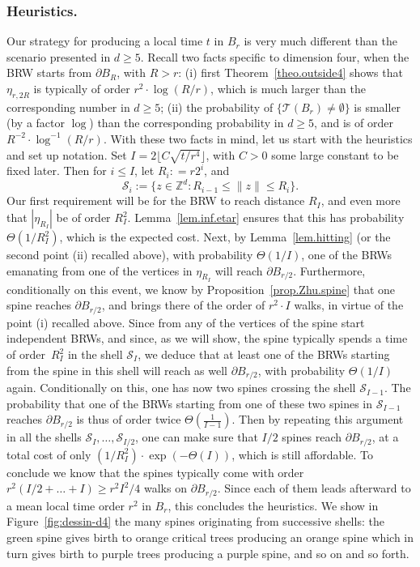 \subsubsection*{Heuristics.}
Our strategy for producing a local time $t$ in $B_r$
is very much different than the scenario presented in $d\ge 5$.
Recall
two facts specific to dimension four, when the BRW starts from $\partial B_R$, with $R>r$: (i) first Theorem~\ref{theo.outside4} shows that $\eta_{r,2R}$
is typically of order
$r^2\cdot \log(R/r)$, which is much larger than the corresponding
number in $d\ge 5$; (ii) the probability of $\{\mathcal T(B_r) \neq
\emptyset\}$ is smaller (by a factor $\log$) than the corresponding
probability in $d\ge 5$, and is of order $R^{-2}\cdot\log^{-1}(R/r)$.
With these two facts in mind, let us start with the heuristics and
set up notation.
Set $I = 2\lfloor C\sqrt{t/r^4}\rfloor $, with $C>0$ some large constant to be fixed later.
Then for $i\le I$, let $R_i: = r 2^i$, and
\[
\mathcal S_i:= \{z\in \mathbb Z^d : R_{i-1} \le \|z\|\le R_i\}.
\]
Our first requirement will be for the BRW to reach distance $R_I$,
and even more that $|\eta_{R_I}|$ be of order $R_I^2$.
Lemma~\ref{lem.inf.etar} ensures that this has probability $\Theta(1/R_I^2)$, which is the expected cost.
Next, by Lemma~\ref{lem.hitting} (or the second point (ii) recalled above), with probability $\Theta(1/I)$, one of the BRWs emanating from one of the vertices in $\eta_{R_I}$ will reach $\partial B_{r/2}$.
Furthermore, conditionally on this event,
we know by Proposition~\ref{prop.Zhu.spine}
that one spine reaches $\partial B_{r/2}$, and brings there of the order
of $r^2\cdot I$ walks, in virtue of the point (i) recalled above.
Since from any of the vertices of the spine start independent BRWs,
and since, as we will show, the spine typically spends a time
of order~$R_I^2$ in the shell $\mathcal S_I$,
we deduce that at least one of the BRWs starting from the
spine in this shell will reach as well $\partial B_{r/2}$,
with probability $\Theta(1/I)$ again.
Conditionally on this, one has now two spines
crossing the shell $\mathcal S_{I-1}$.
The probability that one of the BRWs starting from one of these two spines in $\mathcal S_{I-1}$ reaches $\partial B_{r/2}$ is thus of
order twice $\Theta(\frac 1{I-1})$. Then by repeating this argument in all the shells $\mathcal S_I,\dots,\mathcal S_{I/2}$,
one can make sure that $I/2$ spines reach $\partial B_{r/2}$, at a total cost of only
$(1/R_I^2)\cdot \exp(-\Theta(I))$, which is still affordable.
To conclude we know that the spines typically come with
order $r^2(I/2+\dots+I)\ge r^2I^2/4$ walks on $\partial B_{r/2}$.
Since each of them leads afterward to a mean local time order
$r^2$ in $B_r$, this concludes the heuristics. We show in
Figure~\ref{fig:dessin-d4} the many spines originating from successive
shells: the green spine gives birth to orange critical trees producing
an orange spine which in turn gives birth to purple trees producing
a purple spine, and so on and so forth.

